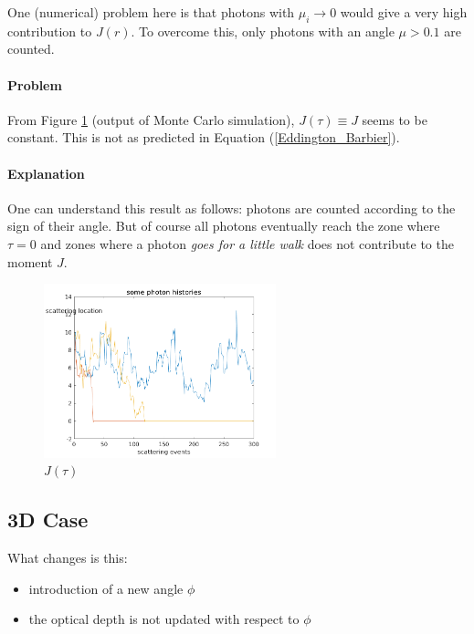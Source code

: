\documentclass[../main/main.tex]{subfiles}
\begin{document}
One (numerical) problem here is that photons with $\mu_i \rightarrow 0$ would give a very high contribution to $J(r)$. To overcome this, only photons with an angle $\mu > 0.1$ are counted.

\paragraph{Problem} From Figure \ref{J(tau)} (output of Monte Carlo simulation), $J(\tau) \equiv J$ seems to be constant. This is not as predicted in Equation (\ref{Eddington_Barbier}).

\paragraph{Explanation}
One can understand this result as follows: photons are counted according to the sign of their angle. But of course all photons eventually reach the zone where $\tau = 0$ and zones where a photon \textit{goes for a little walk} does not contribute to the moment $J$. 

\begin{figure}[!htp]
\centering
\includegraphics[width=0.6\textwidth]{../../introductory_exercises/limb_darkening/figures/photon_path_tau_nphot100000.png}
\caption{$J(\tau)$}
\label{J(tau)}
\end{figure}

\newpage
\subsection{3D Case}
\label{3D_limb_darkening}

What changes is this: 
\begin{itemize}
\item introduction of a new angle $\phi$
\item the optical depth is not updated with respect to $\phi$ 
\end{itemize}
\end{document}
